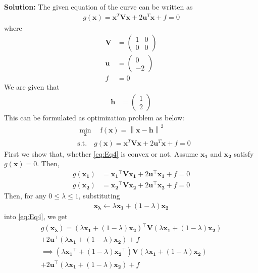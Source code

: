 \documentclass[12pt]{article}
\providecommand{\brak}[1]{\ensuremath{\left(#1\right)}}
\providecommand{\norm}[1]{\left\lVert#1\right\rVert}
\newcommand{\solution}{\noindent \textbf{Solution: }}
\newcommand{\myvec}[1]{\ensuremath{\begin{pmatrix}#1\end{pmatrix}}}
\let\vec\mathbf
\begin{document}
\begin{enumerate}
\solution 
The given equation of the curve can be written as  
\begin{align}
	\label{eq:parabolaEq2}
	g\brak{\vec{x}} = \vec{x}^T\vec{V}\vec{x} + 2\vec{u}^T\vec{x} + f = 0 
\end{align}
where
\begin{align}
	\label{eq:eqV}
	\vec{V} &= \myvec{ 1 & 0 \\ 0 & 0} \\
	\label{eq:eqU}
	\vec{u} &= \myvec{0 \\ -2} \\
	\label{eq:eqF}
	f &= 0 
\end{align}
We are given that 
\begin{align}
	\vec{h} &= \myvec{1 \\ 2}
\end{align}
This can be formulated as optimization problem as below:
\begin{align}
	\label{eq:Eq3}
	&  \min_{\vec{x}} \quad \text{f}\brak{\vec{x}} = \norm{\vec{x}-\vec{h}}^2\\
	\label{eq:Eq4}
	& \text{s.t.}\quad g\brak{\vec{x}} = \vec{x}^T\vec{V}\vec{x} + 2\vec{u}^T\vec{x} + f = 0  
\end{align}
First we show that, whether \eqref{eq:Eq4} is convex or not. Assume 
    $\vec{x_1}$ and $\vec{x_2}$ satisfy $g\brak{\vec{x}} = 0$. Then, 
\begin{align}
	\label{eq:x1-parab} 
	g\brak{\vec{x_1}} &= \vec{x_1}^\top\vec{Vx_1} + 2\vec{u}^\top\vec{x_1} + f = 0  \\ 
	\label{eq:x2-parab}
	g\brak{\vec{x_2}} &= \vec{x_2}^\top\vec{Vx_2} + 2\vec{u}^\top\vec{x_2} + f = 0 
\end{align}
Then, for any $0 \le \lambda \le 1$, substituting
\begin{align}
       \vec{x_\lambda} \leftarrow \lambda\vec{x_1} + \brak{1-\lambda}\vec{x_2}
\end{align}
into \eqref{eq:Eq4}, we get
\begin{multline}
        \label{eq:Eq5}
	g\brak{\vec{x_\lambda}} = \brak{\lambda\vec{x_1}+\brak{1-\lambda}\vec{x_2}}^\top\vec{V} \brak{\lambda\vec{x_1}+\brak{1-\lambda}\vec{x_2}} \\
	+ 2\vec{u}^\top\brak{\lambda\vec{x_1}+\brak{1-\lambda}\vec{x_2}} +f \\
	\implies 
	\brak{\lambda\vec{x_1}^\top+\brak{1-\lambda}\vec{x_2}^\top}\vec{V} \brak{\lambda\vec{x_1}+\brak{1-\lambda}\vec{x_2}} \\
	+ 2\vec{u}^\top\brak{\lambda\vec{x_1}+\brak{1-\lambda}\vec{x_2}} +f \\

\end{multline}
\end{enumerate}
\end{document}
